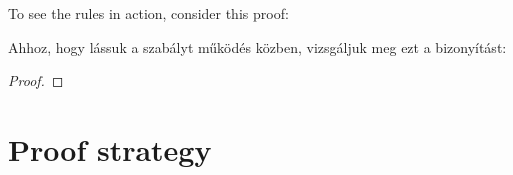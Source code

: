 


To see the rules in action, consider this proof:

Ahhoz, hogy lássuk a szabályt működés közben, vizsgáljuk meg ezt a bizonyítást:

\begin{proof}
	\open
	\close
\end{proof}


\section{Proof strategy}

